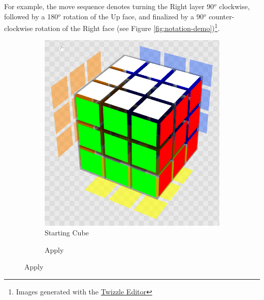 For example, the move sequence  denotes turning the Right
layer 90$^o$ clockwise, followed by a 180$^o$ rotation of the Up face,
and finalized by a 90$^o$ counter-clockwise rotation of the Right face
(see Figure \ref{fig:notation-demo})\footnote{Images generated with the
\href{https://alpha.twizzle.net/edit/?alg=R+U2+R\%27}{Twizzle Editor}}.

\begin{figure}[h]
    \centering
    \caption{The move sequence }
    \label{fig:notation-demo}
    \begin{subfigure}{0.25\textwidth}
        \centering
        \caption{Starting Cube}
        \label{fig:notation-demo-start}
        \includegraphics[width=.90\linewidth]{Figures/2 Background/start.png}
    \end{subfigure}%
    \begin{subfigure}{0.25\textwidth}
        \centering
        \caption{Apply }
        \label{fig:notation-demo-r}

\end{subfigure}
\end{figure}
